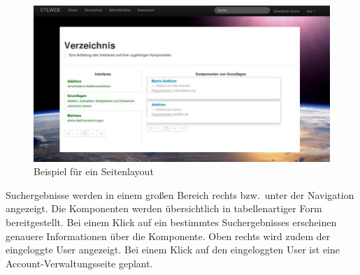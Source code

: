 \begin{figure}
\includegraphics[width=0.8\linewidth]{bilder/ctlweb.pdf}
\caption{Beispiel für ein Seitenlayout}
\label{fig:gui}
\end{figure}

Suchergebnisse werden in einem großen Bereich rechts bzw.\ unter der Navigation angezeigt. 
Die Komponenten werden übersichtlich in tabellenartiger Form bereitgestellt. Bei einem Klick auf ein bestimmtes Suchergebnisses erscheinen genauere Informationen über die Komponente. 
Oben rechts wird zudem der eingeloggte User angezeigt.
Bei einem Klick auf den eingeloggten User ist eine Account-Verwaltungsseite geplant.
